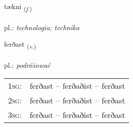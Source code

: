 \documentclass[frontgrid, backgrid]{flacards}\usepackage[]{graphicx}\usepackage[]{xcolor}
\begin{document}
\renewcommand{\flhead}{\vskip5pt \fboxsep=0pt {\small\bfseries\footnotesize Nafnorð | Noun}}
\renewcommand{\fcfoot}{\vskip5pt \fboxsep=0pt \hspace{2pt}{\small\bfseries\footnotesize 2K}}

\renewcommand{\blhead}{\vskip5pt {\small\bfseries\footnotesize Nafnorð | Noun }}
\renewcommand{\bcfoot}{\vskip5pt \hspace{2pt}{\small\bfseries\footnotesize 2K}}


{tækni \small{\textsubscript{(\textit{f.})}} \\[1ex] %
\textphonetic{[tʰaihknɪ]} \\
pl.: \emph{technologia; technika} \\  [2ex]
\renewcommand*{\arraystretch}{0.8}
}

\renewcommand{\flhead}{\vskip5pt \fboxsep=0pt {\small\bfseries\footnotesize Sagnorð | Verb}}
\renewcommand{\fcfoot}{\vskip5pt \fboxsep=0pt \hspace{2pt}{\small\bfseries\footnotesize 2K}}

\renewcommand{\blhead}{\vskip5pt {\small\bfseries\footnotesize Sagnorð | Verb }}
\renewcommand{\bcfoot}{\vskip5pt \hspace{2pt}{\small\bfseries\footnotesize 2K}}


{ferðast \small{\textsubscript{(\textit{v.})}} \\[1ex] %
\textphonetic{[fɛrðast]} \\
pl.: \emph{podróżować} \\  [2ex]
\renewcommand*{\arraystretch}{0.8}
\begin{tabular}{p{1cm}l}
\textsc{1sg}: & ferðast -- ferðaðist -- ferðast \\ 
\textsc{2sg}: & ferðast -- ferðaðist -- ferðast \\ 
\textsc{3sg}: & ferðast -- ferðaðist -- ferðast \\ 
\end{tabular}
}
\end{document}

